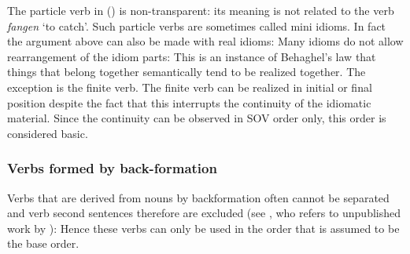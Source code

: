 \noindent
The particle verb in () is non-transparent: its meaning is not related to the verb
\emph{fangen} `to catch'. Such particle verbs are sometimes called mini
idioms. In fact the argument above can also be made with real idioms: Many idioms do not allow
rearrangement of the idiom parts:
\eal
{}
\zl
This is an instance of Behaghel's law \citeyearpar{Behaghel32-u}
that things that belong together semantically tend to be realized together. The exception is the
finite verb. The finite verb can be realized in initial or final position despite the fact that this
interrupts the continuity of the idiomatic material. Since the continuity can be observed in SOV
order only, this order is considered basic.

\subsubsection{Verbs formed by back-formation}

Verbs that are derived from nouns by backformation often cannot be separated and verb second
sentences therefore are excluded (see \citealt[]{Haider93a}, who refers to unpublished work by \citealt{Hoehle91b}):
\eal
{}
\zl
Hence these verbs can only be used in the order that is assumed to be the base order.

